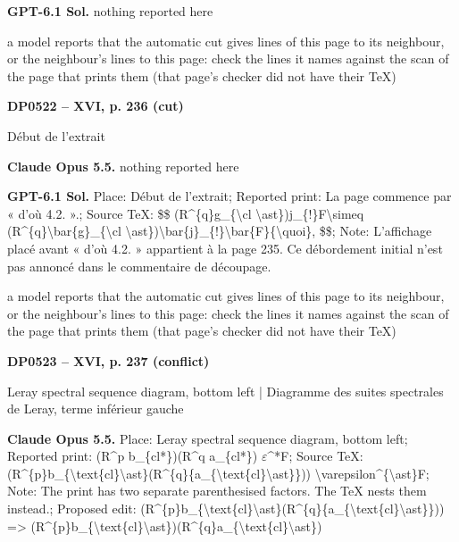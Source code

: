 \textbf{GPT-6.1 Sol.} nothing reported here\par
a model reports that the automatic cut gives lines of this page to its neighbour, or the neighbour's lines to this page: check the lines it names against the scan of the page that prints them (that page's checker did not have their TeX)\par
\par\noindent\hypertarget{DP0522}{}\textbf{DP0522 -- XVI, p. 236 (cut)}\par
Début de l'extrait\par
\textbf{Claude Opus 5.5.} nothing reported here\par
\textbf{GPT-6.1 Sol.} Place: Début de l'extrait; Reported print: La page commence par « d'où 4.2. ».; Source TeX: \$\$ (R\textasciicircum{}\{q\}g\_\{\textbackslash{}cl \textbackslash{}ast\})j\_\{!\}F\textbackslash{}simeq (R\textasciicircum{}\{q\}\textbackslash{}bar\{g\}\_\{\textbackslash{}cl \textbackslash{}ast\})\textbackslash{}bar\{j\}\_\{!\}\textbackslash{}bar\{F\}\{\textbackslash{}quoi\}, \$\$; Note: L'affichage placé avant « d'où 4.2. » appartient à la page 235. Ce débordement initial n'est pas annoncé dans le commentaire de découpage.\par
a model reports that the automatic cut gives lines of this page to its neighbour, or the neighbour's lines to this page: check the lines it names against the scan of the page that prints them (that page's checker did not have their TeX)\par
\par\noindent\hypertarget{DP0523}{}\textbf{DP0523 -- XVI, p. 237 (conflict)}\par
Leray spectral sequence diagram, bottom left | Diagramme des suites spectrales de Leray, terme inférieur gauche\par
\textbf{Claude Opus 5.5.} Place: Leray spectral sequence diagram, bottom left; Reported print: (R\textasciicircum{}p b\_\{cl*\})(R\textasciicircum{}q a\_\{cl*\}) \ensuremath{\varepsilon}\textasciicircum{}*F; Source TeX: (R\textasciicircum{}\{p\}b\_\{\textbackslash{}text\{cl\}\textbackslash{}ast\}(R\textasciicircum{}\{q\}\{a\_\{\textbackslash{}text\{cl\}\textbackslash{}ast\}\})) \textbackslash{}varepsilon\textasciicircum{}\{\textbackslash{}ast\}F; Note: The print has two separate parenthesised factors. The TeX nests them instead.; Proposed edit: (R\textasciicircum{}\{p\}b\_\{\textbackslash{}text\{cl\}\textbackslash{}ast\}(R\textasciicircum{}\{q\}\{a\_\{\textbackslash{}text\{cl\}\textbackslash{}ast\}\})) =\allowbreak > (R\textasciicircum{}\{p\}b\_\{\textbackslash{}text\{cl\}\textbackslash{}ast\})(R\textasciicircum{}\{q\}a\_\{\textbackslash{}text\{cl\}\textbackslash{}ast\})\par
